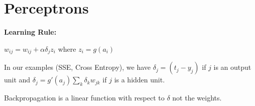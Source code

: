 \section{Perceptrons}
\textbf{Learning Rule:} 

$w_{ij} = w_{ij} + \alpha \delta_{j} z_{i}$ where $z_{i} = g(a_i)$

In our examples (SSE, Cross Entropy), we have $\delta_j = (t_j - y_j)$ if $j$ is an output unit and $\delta_j = g'(a_j) \sum_k \delta_k w_{jk}$ if $j$ is a hidden unit.

Backpropagation is a linear function with respect to $\delta$ not the weights.
